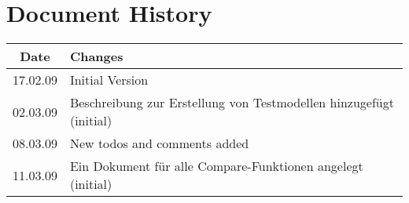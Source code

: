 %
%




	
	
	
	\clearpage
	\tableofcontents
	
	\chapter*{Document History}
	\begin{tabular}{|c|p{11cm}|}\hline
		Date & Changes \\\hline\hline
		17.02.09 & Initial Version \\\hline
		02.03.09 & Beschreibung zur Erstellung von Testmodellen hinzugefügt (initial) \\\hline
		08.03.09 & New todos and comments added \\\hline
		11.03.09 & Ein Dokument für alle Compare-Funktionen angelegt (initial) \\\hline
	\end{tabular}
	
	
	
	\setcounter{lastromanpagenum}{\value{page}}
	
	\clearpage

	
	
	
	
	
	
	
	

	
	
